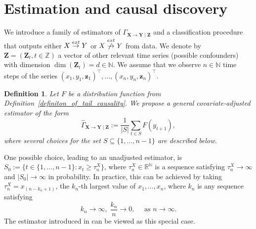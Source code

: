 \documentclass[a4paper,11pt]{article}
\newtheorem{definition}{Definition}
\newcommand{\toverset}[2]{\overset{{\rm #1}}{#2}}
\begin{document}
\section{Estimation and causal discovery}
\label{Section_estimation}



We introduce a family of estimators of ${\Gamma}_{\textbf{X}\to\textbf{Y}\mid\mathcal{\textbf{Z}}}$ and a classification procedure that outputs either $\textbf{X}\toverset{ext}{\to}\textbf{Y}$ or $\textbf{X}\toverset{ext}{\not\to}\textbf{Y}$ from data. We denote by  $\textbf{Z} = (\textbf{Z}_t, t\in\mathbb{Z})$ a vector of other relevant time series (possible confounders) with dimension $\dim(\textbf{Z}_t) = d\in\mathbb{N}$.  We assume that we observe $n\in\mathbb{N}$ time steps of the series $(x_1, y_1, \textbf{z}_1)^\top, \dots, (x_n, y_n, \textbf{z}_n)^\top$. 
\begin{definition}\label{Gamma_hat_original}
Let $F$ be a distribution function from Definition~\ref{definiton_of_tail_causality}. We propose a general covariate-adjusted estimator of the form
  \begin{equation}\label{Gamma_hat_equation}
\hat{\Gamma}_{\textbf{X}\to\textbf{Y}\mid\mathcal{\textbf{Z}}}:=\frac{1}{|S|}\sum_{t\in S} F(y_{t+1}),
  \end{equation}
 where several choices for the set $S\subseteq\{1, \dots, n-1\}$ are described below. 
\end{definition}

One possible choice, leading to an unadjusted estimator, is $S_0:= \{t\in \{1, \dots, n-1\} : x_t\geq\tau_n^X\}$, where $\tau_n^X\in\mathbb{R}^{\mathbb{N}}$ is a sequence satisfying $\tau_n^X\to\infty$ and $|S_0|\to\infty$ in probability. In practice, this can be achieved by taking $\tau_n^X=x_{(n-k_n+1)}$, the $k_n$-th largest value of $x_1, \dots, x_n$, where $k_n$ is any sequence satisfying
\begin{equation}
 \label{k_deleno_n}
 k_n\to\infty, \; \frac{k_n}{n}\to 0, \quad \text{ as } n\to\infty.
\end{equation}
The estimator introduced in \cite{bodik} can be viewed as this special case. 
\end{document}
